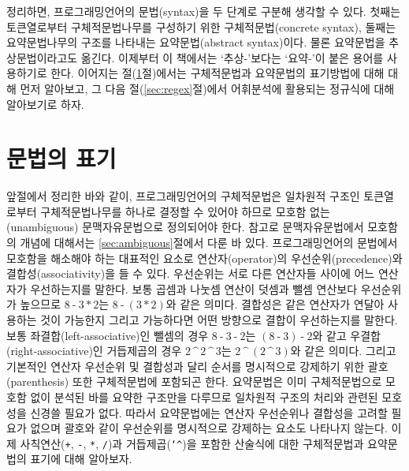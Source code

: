 정리하면, 프로그래밍언어의 문법(syntax)을 두 단계로 구분해 생각할 수 있다.
첫째는 토큰열로부터 구체적문법나무를 구성하기 위한
구체적문법(concrete syntax), 둘째는 요약문법나무의 구조를
나타내는 요약문법(abstract syntax)이다. 물론 요약문법을
추상문법이라고도 옮긴다. 이제부터 이 책에서는 `추상-'보다는 `요약-'이 붙은
용어를 사용하기로 한다. 이어지는 절(\ref{sec:GrammarNotation}절)에서는
구체적문법과 요약문법의 표기방법에 대해 대해 먼저 알아보고,
그 다음 절(\ref{sec:regex}절)에서 어휘분석에 활용되는 정규식에
대해 알아보기로 하자.

\section{문법의 표기}
\label{sec:GrammarNotation}
앞절에서 정리한 바와 같이, 프로그래밍언어의 구체적문법은 일차원적 구조인
토큰열로부터 구체적문법나무를 하나로 결정할 수 있어야 하므로 모호함 없는
(unambiguous) 문맥자유문법으로 정의되어야 한다. 참고로 문맥자유문법에서
모호함의 개념에 대해서는 \ref{sec:ambiguous}절에서 다룬 바 있다.
프로그래밍언어의 문법에서 모호함을 해소해야 하는 대표적인 요소로
연산자(operator)의 우선순위(precedence)와 결합성(associativity)을 들 수 있다.
우선순위는 서로 다른 연산자들 사이에 어느 연산자가 우선하는지를 말한다.
보통 곱셈과 나눗셈 연산이 덧셈과 뺄셈 연산보다 우선순위가 높으므로
$8\mathop{\texttt{-}} 3\mathop{\texttt{*}}2 $는
$8\mathop{\texttt{-}}(3\mathop{\texttt{*}}2)$와 같은 의미다.
결합성은 같은 연산자가 연달아 사용하는 것이 가능한지 그리고
가능하다면 어떤 방향으로 결합이 우선하는지를 말한다.
보통 좌결합(left-associative)인 뺄셈의 경우
$ 8\mathop{\texttt{-}}3 \mathop{\texttt{-}}2$는
$(8\mathop{\texttt{-}}3)\mathop{\texttt{-}}2$와 같고
우결합(right-associative)인 거듭제곱의 경우
$2\mathop{\texttt{\char`^}} 2\mathop{\texttt{\char`^}}3 $는
$2\mathop{\texttt{\char`^}}(2\mathop{\texttt{\char`^}}3)$와 같은 의미다.
그리고 기본적인 연산자 우선순위 및 결합성과 달리 순서를 명시적으로
강제하기 위한 괄호(parenthesis) 또한 구체적문법에 포함되곤 한다.
요약문법은 이미 구체적문법으로 모호함 없이 분석된 바를 요약한 구조만을
다루므로 일차원적 구조의 처리와 관련된 모호성을 신경쓸 필요가 없다.
따라서 요약문법에는 연산자 우선순위나 결합성을 고려할 필요가 없으며
괄호와 같이 우선순위를 명시적으로 강제하는 요소도 나타나지 않는다.
이제 사칙연산(\texttt{+}, \texttt{-}, \texttt{*}, \texttt{/})과
거듭제곱(\texttt{\char`^})을 포함한 산술식에 대한 구체적문법과
요약문법의 표기에 대해 알아보자.

